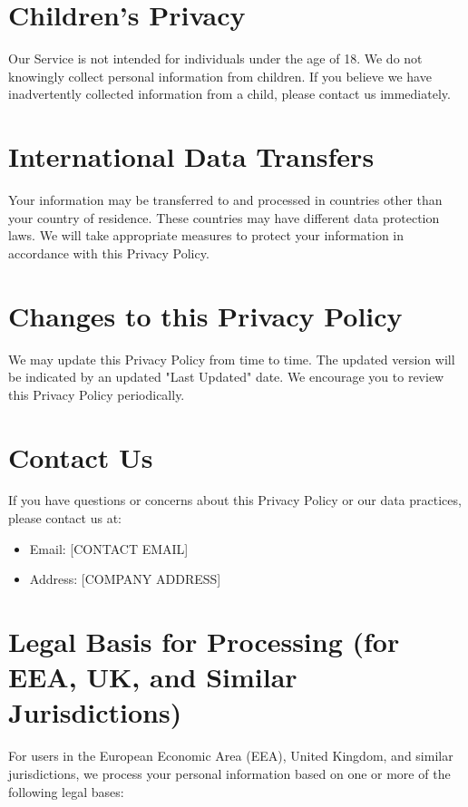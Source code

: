 \documentclass[12pt]{article}
\begin{document}
\section{Children's Privacy}

Our Service is not intended for individuals under the age of 18. We do not knowingly collect personal information from children. If you believe we have inadvertently collected information from a child, please contact us immediately.

\section{International Data Transfers}

Your information may be transferred to and processed in countries other than your country of residence. These countries may have different data protection laws. We will take appropriate measures to protect your information in accordance with this Privacy Policy.

\section{Changes to this Privacy Policy}

We may update this Privacy Policy from time to time. The updated version will be indicated by an updated "Last Updated" date. We encourage you to review this Privacy Policy periodically.

\section{Contact Us}

If you have questions or concerns about this Privacy Policy or our data practices, please contact us at:

\begin{itemize}
    \item Email: [CONTACT EMAIL]
    \item Address: [COMPANY ADDRESS]
\end{itemize}

\section{Legal Basis for Processing (for EEA, UK, and Similar Jurisdictions)}

For users in the European Economic Area (EEA), United Kingdom, and similar jurisdictions, we process your personal information based on one or more of the following legal bases:
\end{document}
